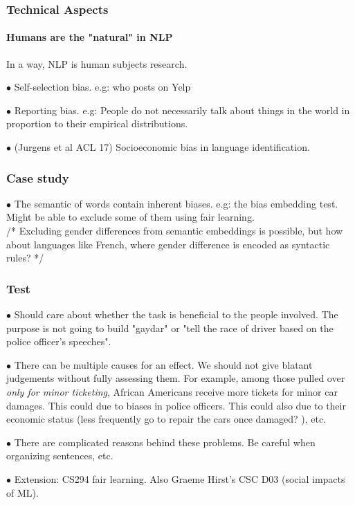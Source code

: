 \subsubsection{Technical Aspects}
\paragraph{Humans are the "natural" in NLP}
In a way, NLP is human subjects research.

$\bullet$ Self-selection bias. e.g: who posts on Yelp

$\bullet$ Reporting bias. e.g: People do not necessarily talk about things in the world in proportion to their empirical distributions.

$\bullet$ (Jurgens et al ACL 17) Socioeconomic bias in language identification.

\subsubsection{Case study}

$\bullet$ The semantic of words contain inherent biases. e.g: the bias embedding test. Might be able to exclude some of them using fair learning. \\
/* Excluding gender differences from semantic embeddings is possible, but how about languages like French, where gender difference is encoded as syntactic rules? */


\subsubsection{Test}

$\bullet$ Should care about whether the task is beneficial to the people involved. The purpose is not going to build "gaydar" or "tell the race of driver based on the police officer's speeches". 

$\bullet$ There can be multiple causes for an effect. We should not give blatant judgements without fully assessing them. For example, among those pulled over \emph{only for minor ticketing}, African Americans receive more tickets for minor car damages. This could due to biases in police officers. This could also due to their economic status (less frequently go to repair the cars once damaged? ), etc.

$\bullet$ There are complicated reasons behind these problems. Be careful when organizing sentences, etc.

$\bullet$ Extension: CS294 fair learning. Also Graeme Hirst's CSC D03 (social impacts of ML).

